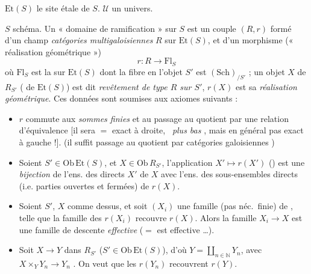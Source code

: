 \documentclass[11pt,a4paper]{article}
\begin{document}

$\mathrm{Et}(S)$ le site étale de $S$. $\mathcal{U}$ un univers.

$S$ schéma. Un « domaine de ramification » sur $S$ est un couple $(R, r)$ formé
d'un champ  \emph{catégories multigaloisiennes}
$R$ sur $\mathrm{Et}(S)$, et d'un morphisme 
 (« réalisation géométrique »)
\[
  r : R \longrightarrow \mathrm{Fl}_S
\]
où $\mathrm{Fl}_S$ est la  \struck{\ill{}} sur
$\mathrm{Et}(S)$ dont la fibre en l'objet $S'$ est $(\mathrm{Sch})_{/S'}$ ;
\struck{\ill{}} un objet $X$ de $R_{S'}$ ( de $\mathrm{Et}(S)$)
est dit \emph{revêtement de type $R$ sur $S'$}, \struck{\ill{}} $r(X)$ est sa
\emph{réalisation géométrique}.  Ces données
sont soumises aux axiomes suivants :

\begin{itemize}
\item[\textbf{R1}]  $r$ commute aux \emph{sommes finies} et
au passage au quotient par une relation d'équivalence [il sera
$=$ exact à droite, \ \emph{plus bas} \ill{}, mais en
général pas exact à gauche !]. (il suffit passage au quotient
par  \ill{}  catégories galoisiennes \ill{})


\item[\textbf{R2}]  Soient $S' \in \mathrm{Ob}\,\mathrm{Et}(S)$,
et $X \in \mathrm{Ob}\,R_{S'}$, l'application $X' \mapsto r(X')$
() est une \emph{bijection} de l'ens. des
  directs $X'$ de $X$ avec l'ens. des sous-ensembles
directs (i.e. parties ouvertes et fermées) de $r(X)$.

\item[\textbf{R3}] Soient $S'$, $X$ comme dessus, et soit \struck{\ill{}}
$(X_i)$ une famille (pas néc.\ finie) de ,
telle que la famille des $r(X_i)$ recouvre $r(X)$. Alors la famille
$X_i \to X$ est une famille de descente \emph{effective}
($=$ est  effective \ldots).

\item[\textbf{R4}] Soit $X \to Y$ dans $R_{S'}$
($S' \in \mathrm{Ob}\,\mathrm{Et}(S)$), d'où $Y = \coprod_{n \in \mathbb{N}} Y_n$, avec $X \times_Y Y_n \to Y_n$
. On veut que les $r(Y_n)$
recouvrent $r(Y)$.
\end{itemize}
\end{document}

